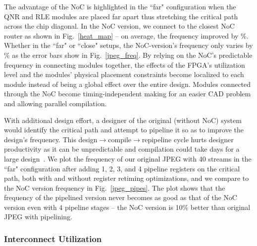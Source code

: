 The advantage of the NoC is highlighted in the ``far" configuration when the QNR and RLE modules are placed far apart thus stretching the critical path across the chip diagonal.
In the NoC version, we connect to the closest NoC router as shown in Fig.~\ref{heat_map} -- on average, the frequency improved by \%.
Whether in the ``far" or ``close" setups, the NoC-version's frequency only varies by \% as the error bars show in Fig.~\ref{jpeg_freq}.
By relying on the NoC's predictable frequency in connecting modules together, the effects of the FPGA's utilization level and the modules' physical placement constraints become localized to each module instead of being a global effect over the entire design.
Modules connected through the NoC become timing-independent making for an easier CAD problem and allowing parallel compilation.


With additional design effort, a designer of the original (without NoC) system would identify the critical path and attempt to pipeline it so as to improve the design's frequency.
This design$\rightarrow$compile$\rightarrow$repipeline cycle hurts designer productivity as it can be unpredictable and compilation could take days for a large design~\cite{Murray2014}.
We plot the frequency of our original JPEG with 40 streams in the ``far" configuration after adding 1, 2, 3, and 4 pipeline registers on the critical path, both with and without register retiming optimizations, and we compare to the NoC version frequency in Fig.~\ref{jpeg_pipes}.
The plot shows that the frequency of the pipelined version never becomes as good as that of the NoC version even with 4 pipeline stages -- the NoC version is 10\% better than original JPEG with pipelining.



\subsubsection{Interconnect Utilization}

